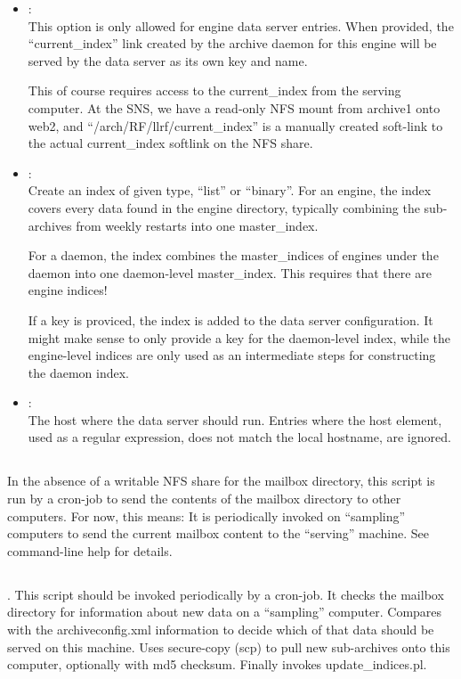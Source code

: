 \begin{itemize}
\item {}:\\
      This option is only allowed for engine data server entries.
      When provided, the ``current\_index'' link created by the
      archive daemon for this engine will be served by the
      data server as its own key and name.

      This of course requires access to the current\_index from the
      serving computer. At the SNS, we have a read-only NFS mount from
      archive1 onto web2, and ``/arch/RF/llrf/current\_index'' is a
      manually created soft-link to the actual current\_index softlink
      on the NFS share.
\item {}: \\
      Create an index of given type, ``list'' or ``binary''.
      For an engine, the index covers every data found in the engine
      directory, typically combining the sub-archives from weekly
      restarts into one master\_index.

      For a daemon, the index combines the master\_indices of engines
      under the daemon into one daemon-level master\_index. This
      requires that there are engine indices!

      If a key is proviced, the index is added to the data server
      configuration. It might make sense to only provide a key for the
      daemon-level index, while the engine-level indices are only used
      as an intermediate steps for constructing the daemon index.            
\item {}: \\
      The host where the data server should run. Entries where
      the host element, used as a regular expression, does not match the
      local hostname, are ignored.
\end{itemize}

\subsection{}
In the absence of a writable NFS share for the mailbox directory,
this script is run by a cron-job to send the contents of the mailbox
directory to other computers.
For now, this means: It is periodically invoked on ``sampling''
computers to send the current mailbox content to the ``serving''
machine. See command-line help for details.

\subsection{} \label{sec:updateServer}.
This script should be invoked periodically by a cron-job.
It checks the mailbox directory for information about new data on a
``sampling'' computer. Compares with the archiveconfig.xml information
to decide which of that data should be served on this machine. Uses
secure-copy (scp) to pull new sub-archives onto this computer,
optionally with md5 checksum.  Finally invokes update\_indices.pl.

